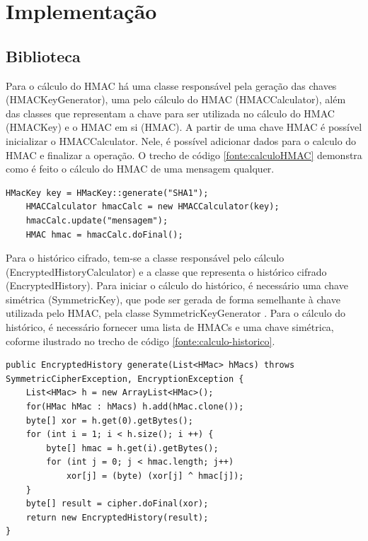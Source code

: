 \chapter{Implementação}

\section{Biblioteca}

Para o cálculo do \ac{HMAC} há uma classe respons\'{a}vel pela gera\c{c}\~{a}o das chaves (\ac{HMAC}KeyGenerator), uma pelo cálculo do \ac{HMAC} (\ac{HMAC}Calculator), al\'{e}m das classes que representam a chave para ser utilizada 
no cálculo do \ac{HMAC} (\ac{HMAC}Key) e o \ac{HMAC} em si (\ac{HMAC}).
A partir de uma chave \ac{HMAC} \'{e} poss\'{i}vel inicializar o \ac{HMAC}Calculator. Nele, \'{e} poss\'{i}vel adicionar dados para o calculo do \ac{HMAC} e finalizar a opera\c{c}\~{a}o.
 O trecho de código \ref{fonte:calculoHMAC} demonstra como é feito o cálculo do \ac{HMAC} de uma mensagem qualquer.

\lstset{language=JAVA,
	basicstyle=\small,
        breaklines=true,
        numbersep=5pt,
        xleftmargin=.35in,
        xrightmargin=.35in}
\begin{lstlisting}[label=fonte:calculoHMAC, caption=Exemplo do cálculo do HMAC]
    HMacKey key = HMacKey::generate("SHA1");
    HMACCalculator hmacCalc = new HMACCalculator(key);
    hmacCalc.update("mensagem");
    HMAC hmac = hmacCalc.doFinal();
\end{lstlisting}

Para o hist\'{o}rico cifrado, tem-se a classe respons\'{a}vel pelo cálculo (EncryptedHistoryCalculator) e a classe que representa o hist\'{o}rico cifrado (EncryptedHistory).
 Para iniciar o cálculo do hist\'{o}rico, é necessário uma chave sim\'{e}trica (SymmetricKey), que pode ser gerada de forma semelhante à chave utilizada pelo \ac{HMAC}, pela classe SymmetricKeyGenerator
 . Para o cálculo do hist\'{o}rico, é necessário fornecer uma lista de \ac{HMAC}s e uma chave sim\'{e}trica, coforme ilustrado no trecho de código \ref{fonte:calculo-historico}.

\lstset{language=JAVA,
	basicstyle=\small,
        breaklines=true,
        numbersep=5pt,
        xleftmargin=.35in,
        xrightmargin=.35in}
\begin{lstlisting}[label=fonte:calculo-historico, caption=Exemplo do cálculo do HMAC]
public EncryptedHistory generate(List<HMac> hMacs) throws SymmetricCipherException, EncryptionException {
	List<HMac> h = new ArrayList<HMac>();
	for(HMac hMac : hMacs) h.add(hMac.clone());
	byte[] xor = h.get(0).getBytes();	
	for (int i = 1; i < h.size(); i ++) {
		byte[] hmac = h.get(i).getBytes();
		for (int j = 0; j < hmac.length; j++)
			xor[j] = (byte) (xor[j] ^ hmac[j]);
	}
	byte[] result = cipher.doFinal(xor);
	return new EncryptedHistory(result);
}
\end{lstlisting}

